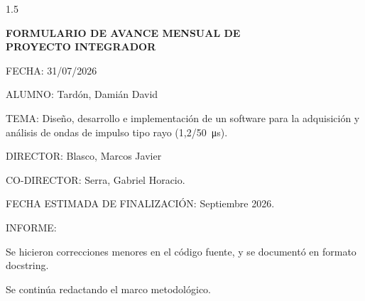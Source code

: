 \documentclass[11pt]{report} %
\begin{document}
    \begin{spacing}{1.5}
        \begin{flushleft}

                \begin{center}
                    \Large
                    \textbf{FORMULARIO DE AVANCE MENSUAL DE\\
                    PROYECTO INTEGRADOR}
                \end{center}
                \vspace{2em}

                FECHA: 31/07/2026

                ALUMNO: Tardón, Damián David

                TEMA: Diseño, desarrollo e implementación de un software para la adquisición y análisis de ondas de impulso tipo rayo (\SI[parse-numbers=false]{1,2/50}{\micro\second}).

                DIRECTOR: Blasco, Marcos Javier

                CO-DIRECTOR: Serra, Gabriel Horacio.

                FECHA ESTIMADA DE FINALIZACIÓN: Septiembre 2026.

                \hrulefill

                INFORME:

        \end{flushleft}
    \end{spacing}

    Se hicieron correcciones menores en el código fuente, y se documentó en formato docstring.

    Se continúa redactando el marco metodológico.
\end{document}
